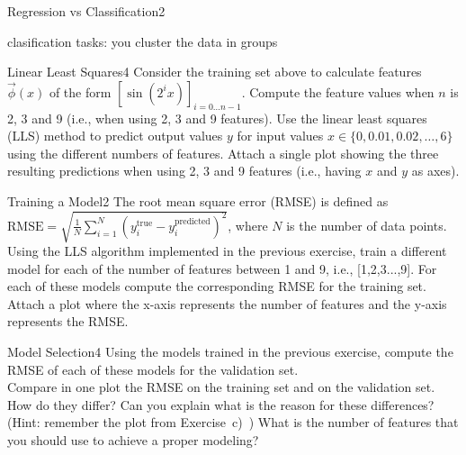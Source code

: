 \begin{questions}
\begin{question}{Regression vs Classification}{2}
\begin{answer}
	clasification tasks: you cluster the data in groups %
	
	
\end{answer}
\end{question}
	
	
	
	\begin{question}{Linear Least Squares}{4}
		Consider the training set above to calculate features $\vec{\phi}(x)$ of the form $[\sin(2^{i}x)]_{i = 0 \ldots n-1}$. 
		Compute the feature values when $n$ is 2, 3 and 9 (i.e., when using 2, 3 and 9 features). 
		Use the linear least squares (LLS) method to predict output values $y$ for input values $x\in\{0, 0.01, 0.02, \ldots, 6\}$ using the different numbers of features. 
		Attach a single plot showing the three resulting predictions when using 2, 3 and 9 features (i.e., having $x$ and $y$ as axes).
		
\begin{answer}
\end{answer}
		
	\end{question}
	
	
	
	\begin{question}{Training a Model}{2}
		The root mean square error (RMSE) is defined as $\text{RMSE} = \sqrt{\frac{1}{N}\sum_{i=1}^{N}(y^{\text{true}}_i-y^{\text{predicted}}_i)^{2}}$, where $N$ is the number of data points. 
		Using the LLS algorithm implemented in the previous exercise, train a different model for each of the number of features between 1 and 9, i.e.,  [1,2,3...,9].
		For each of these models compute the corresponding RMSE for the training set. 
		Attach a plot where the x-axis represents the number of features and the y-axis represents the RMSE.
		
\begin{answer}
\end{answer}
		
	\end{question}
	
	
	
	\begin{question}{Model Selection}{4}
		Using the models trained in the previous exercise, compute the RMSE of each of these models for the validation set.\\
		Compare in one plot the RMSE on the training set and on the validation set. 
		How do they differ? 
		Can you explain what is the reason for these differences? (Hint: remember the plot from Exercise~c)~) 
		What is the number of features that you should use to achieve a proper modeling?
		

\end{question}
\end{questions}

